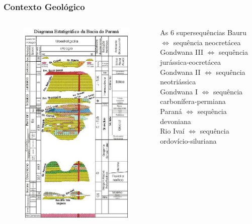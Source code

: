 \documentclass[10pt]{beamer} %
\begin{document}
\begin{frame}
	\frametitle{Contexto Geológico}
	\begin{columns}
		
		
		\begin{column}{0.4\textwidth}
			\begin{figure}
				\includegraphics[scale=0.4]{Imagens/diagrama.png}
			\end{figure}
		\end{column}
		
		\begin{column}{0.75\textwidth}
			\begin{block}{As $6$ supersequências}
				Bauru $\Longleftrightarrow$  sequência neocretácea\\
				Gondwana III $\Longleftrightarrow$ sequência jurássica-eocretácea\\
				Gondwana II $\Longleftrightarrow$ sequência neotriássica \\
				Gondwana I $\Longleftrightarrow$ sequência carbonífera-permiana\\ 
				Paraná $\Longleftrightarrow$ sequência devoniana\\
				Rio Ivaí $\Longleftrightarrow$ sequência ordovício-siluriana\\
				\cite{Vail_1977,assine_1994,milani_orogenias_1998}
			\end{block}
			

\end{column}
\end{columns}
\end{frame}
\end{document}
